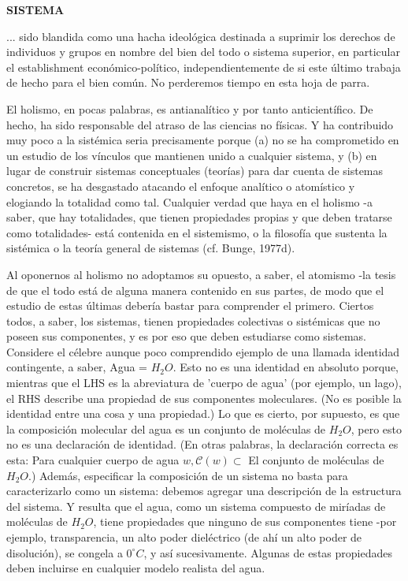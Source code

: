 \newpage
\fancyhf{}
\fancyhead[r]{\thepage}
\begin{center}
{\fontsize{16}{18}\selectfont \textbf{SISTEMA}}
\end{center}
\vspace{0.5cm}

{\fontsize{13}{15}\selectfont
... sido blandida como una hacha ideológica destinada a suprimir los derechos de individuos y grupos en nombre del bien del todo o sistema superior, 
en particular el establishment económico-político, independientemente de si este último trabaja de hecho para el bien común. 
No perderemos tiempo en esta hoja de parra.

El holismo, en pocas palabras, es antianalítico y por tanto anticientífico. De hecho, ha sido responsable del atraso de las ciencias no físicas. 
Y ha contribuido muy poco a la sistémica seria precisamente porque (a) no se ha comprometido en un estudio de los vínculos que mantienen unido a cualquier sistema, 
y (b) en lugar de construir sistemas conceptuales (teorías) para dar cuenta de sistemas concretos, se ha desgastado atacando el enfoque analítico o atomístico y elogiando la totalidad como tal. 
Cualquier verdad que haya en el holismo -a saber, que hay totalidades, que tienen propiedades propias y que deben tratarse como totalidades- está contenida en el sistemismo, o la filosofía que sustenta la sistémica o la teoría general de sistemas (cf. Bunge, 1977d).

Al oponernos al holismo no adoptamos su opuesto, a saber, el atomismo -la tesis de que el todo está de alguna manera contenido en sus partes, de modo que el estudio de estas últimas debería bastar para comprender el primero. 
Ciertos todos, a saber, los sistemas, tienen propiedades colectivas o sistémicas que no poseen sus componentes, y es por eso que deben estudiarse como sistemas. Considere el célebre aunque poco comprendido ejemplo de una llamada identidad contingente, 
a saber, Agua = \( H_2O \). Esto no es una identidad en absoluto porque, mientras que el LHS es la abreviatura de 'cuerpo de agua' (por ejemplo, un lago), el RHS describe una propiedad de sus componentes moleculares. (No es posible la identidad entre una cosa y una propiedad.) 
Lo que es cierto, por supuesto, es que la composición molecular del agua es un conjunto de moléculas de \( H_2O \), pero esto no es una declaración de identidad. (En otras palabras, la declaración correcta es esta: Para cualquier cuerpo de agua \( w, \mathcal{C}(w) \subset \) El conjunto de moléculas de \( H_2O \).) 
Además, especificar la composición de un sistema no basta para caracterizarlo como un sistema: debemos agregar una descripción de la estructura del sistema. Y resulta que el agua, como un sistema compuesto de miríadas de moléculas de \( H_2O \), tiene propiedades que ninguno de sus componentes tiene -por ejemplo, 
transparencia, un alto poder dieléctrico (de ahí un alto poder de disolución), se congela a \( 0^\circ C \), y así sucesivamente. Algunas de estas propiedades deben incluirse en cualquier modelo realista del agua.

}
